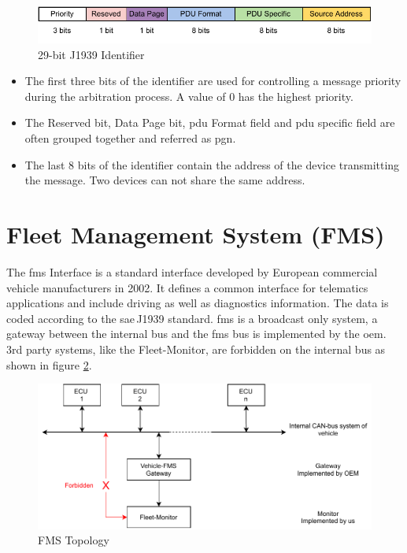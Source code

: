 \begin{figure}[h!]
	\centering
	\includegraphics[width=\textwidth]{images/j1939-identifier}
	\caption{29-bit J1939 Identifier}
	\label{fig:29-bit_J1939_Identifier}
\end{figure}
\begin{itemize}
	\item The first three bits of the identifier are used for controlling a message priority during the arbitration process. A value of 0 has the highest priority.
	\item The Reserved bit, Data Page bit, \acrfull{pdu} Format field and \acrshort{pdu} specific field are often grouped together and referred as \acrfull{pgn}. 
	\item The last 8 bits of the identifier contain the address of the device transmitting the message. Two devices can not share the same address.
\end{itemize}
\newpage

\section{Fleet Management System (FMS)} \label{Fleet Management System (FMS)}
The \acrfull{fms} Interface is a standard interface developed by European commercial vehicle manufacturers in 2002. It defines a common interface for telematics applications and include driving as well as diagnostics information. The data is coded according to the \acrshort{sae}\,J1939 standard. \acrshort{fms} is a broadcast only system, a gateway between the internal bus and the \acrshort{fms} bus is implemented by the \acrshort{oem}. 3rd party systems, like the Fleet-Monitor, are forbidden on the internal bus as shown in figure \ref{fig:fms-bus}. 

\begin{figure}[h!]
	\centering
	\hfuzz=14.0pt
	\includegraphics[width=\textwidth]{images/fms-bus}
	\vspace{-0.2cm}
	\caption{FMS Topology}
	\label{fig:fms-bus}
\end{figure}

